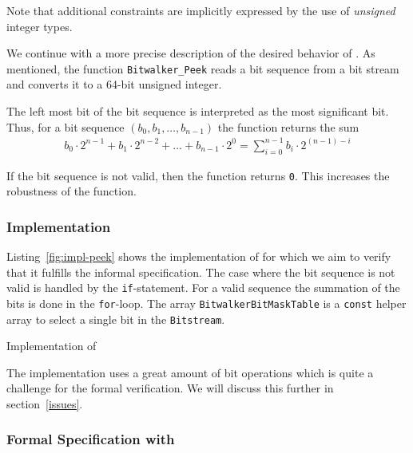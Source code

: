 Note that additional constraints are implicitly expressed by the use
of \emph{unsigned} integer types.

We continue with a more precise description of the desired behavior of \peek.
As mentioned, the function \texttt{Bitwalker\_Peek} reads a bit sequence from a bit stream
and converts it to a 64-bit unsigned integer.

The left most bit of the bit sequence is interpreted as
the most significant bit.
Thus, for a bit sequence $(b_0, b_1,\ldots,b_{n - 1})$ the function
returns the sum
\begin{align}
    b_0 \cdot 2^{n - 1} + b_1\cdot 2^{n - 2} + \ldots + b_{n-1}\cdot 2^0
    =
    \sum_{i=0}^{n-1} b_i \cdot 2^{(n - 1) - i} 
\end{align}

If the bit sequence is not valid, then the function returns \texttt{0}.
This increases the robustness of the function.

\clearpage
\subsubsection{Implementation}
\label{impl-peek}
 
Listing~\ref{fig:impl-peek} shows the \isoc implementation of \peek 
for which we aim to verify that it fulfills the informal specification.
The case where the bit sequence is not valid is handled by the \texttt{if}-statement.
For a valid sequence the summation of the bits is done in the \texttt{for}-loop.
The array \texttt{BitwalkerBitMaskTable} is a \texttt{const} helper array 
to select a single bit in the \texttt{Bitstream}.

\begin{listing}[hbt]
\begin{minipage}{\textwidth}

\end{minipage}
\caption{\label{fig:impl-peek} Implementation of \peek}
\end{listing}

The implementation uses a great amount of bit operations
which is quite a challenge for the formal verification.
We will discuss this further in section~\ref{issues}.

\clearpage

\subsubsection{Formal Specification with \acsl}
\label{formal-peek}

